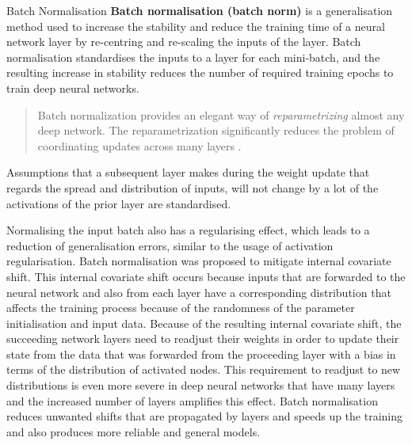   \begin{pabox}{Batch Normalisation}
  \label{def:batch-normalisation-definition}
    \textbf{Batch normalisation (batch norm)} is a generalisation method used to increase the stability and reduce the training time of a neural network layer by re-centring and re-scaling the inputs of the layer.
    Batch normalisation standardises the inputs to a layer for each mini-batch, and the resulting increase in stability reduces the number of required training epochs to train deep neural networks.

    \begin{quote}
      Batch normalization provides an elegant way of \emph{reparametrizing} almost any deep network. 
      The reparametrization significantly reduces the problem of coordinating updates across many layers \cite{goodfellowDeepLearning2016}.
    \end{quote}
    Assumptions that a subsequent layer makes during the weight update that regards the spread and distribution of inputs, will not change by a lot of the activations of the prior layer are standardised. 
  \end{pabox}
  \raggedbottom
  Normalising the input batch also has a regularising effect, which leads to a reduction of generalisation errors, similar to the usage of activation regularisation.
  Batch normalisation was proposed to mitigate internal covariate shift. This internal covariate shift occurs because inputs that are forwarded to the neural network and also from each layer have a corresponding distribution that affects the training process because of the randomness of the parameter initialisation and input data.
  Because of the resulting internal covariate shift, the succeeding network layers need to readjust their weights in order to update their state from the data that was forwarded from the proceeding layer with a bias in terms of the distribution of activated nodes. This requirement to readjust to new distributions is even more severe in deep neural networks that have many layers and the increased number of layers amplifies this effect. Batch normalisation reduces unwanted shifts that are propagated by layers and speeds up the training and also produces more reliable and general models.
  


